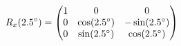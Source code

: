 \documentclass[preview]{standalone}
\begin{document}
\begin{align*}
\special{dvisvgm:raw <g id='unique000'>}R_x(2.5^\circ) = \begin{pmatrix} 1 & 0 & 0 \\ 0 & \cos(2.5^\circ) & -\sin(2.5^\circ) \\ 0 & \sin(2.5^\circ) & \cos(2.5^\circ) \end{pmatrix}\special{dvisvgm:raw </g>}
\end{align*}
\end{document}
